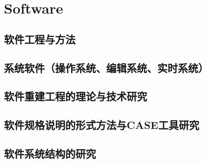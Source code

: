 

\chapter{Software}

\section{软件工程与方法}
\section{系统软件（操作系统、编辑系统、实时系统）}
\section{软件重建工程的理论与技术研究}
\section{软件规格说明的形式方法与CASE工具研究}
\section{软件系统结构的研究}



